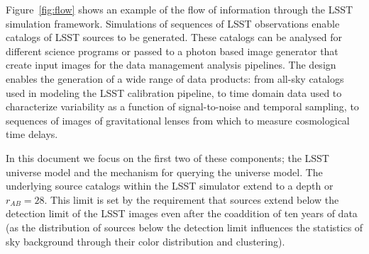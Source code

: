 \documentclass[]{article}
\begin{document}
{Figure~\ref{fig:flow} shows an example of the flow of information
through the LSST simulation framework. Simulations of sequences of
LSST observations enable catalogs of LSST sources to be
generated. These catalogs can be analysed for different science
programs or passed to a photon based image generator that create input
images for the data management analysis pipelines.  The design enables
the generation of a wide range of data products: from all-sky catalogs
used in modeling the LSST calibration pipeline, to time domain data
used to characterize variability as a function of signal-to-noise and
temporal sampling, to sequences of images of gravitational lenses from
which to measure cosmological time delays.

In this document we focus on the first two of these components; the LSST
universe model and the mechanism for querying the universe model.  
The underlying source catalogs within the LSST
simulator extend to a depth or $r_{AB}=28$. This limit is set by the
requirement that sources extend below the detection limit of the LSST
images even after the coaddition of ten years of data (as the
distribution of sources below the detection limit influences the
statistics of sky background through their color distribution and
clustering).

}
\end{document}
